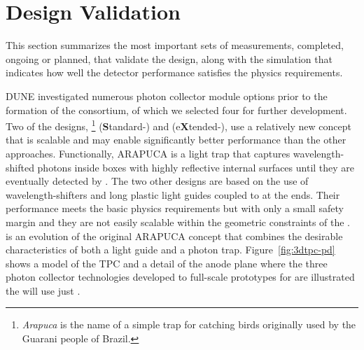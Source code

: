 \section{Design Validation}
\label{sec:fdsp-pd-validation}


This section summarizes the most important sets of measurements, completed, %
ongoing or planned, that validate the  design, along with the  simulation that indicates how well the  detector performance satisfies %
the physics requirements.


DUNE investigated numerous  photon collector module options prior to the formation of the \single {} consortium, of which we selected four for further development. 
Two of the designs, \footnote{\textit{Arapuca} is the name of a simple trap for catching birds originally used by the Guarani people of Brazil.} (\textbf{S}tandard-) and  (e\textbf{X}tended-), use a relatively new concept that is scalable and may enable %
significantly better performance than the other approaches. Functionally, ARAPUCA is %
 a light trap that captures wavelength-shifted photons inside boxes with highly reflective internal surfaces until they are eventually detected by .  The two other designs are based on the use of wavelength-shifters and long plastic light guides coupled to  at the ends. Their performance meets the basic physics requirements but with only a small safety margin and they are not easily scalable within the geometric constraints of the .  is an evolution of the original ARAPUCA concept that combines the desirable characteristics of both a light guide and a photon trap. 
Figure~\ref{fig:3dtpc-pd} shows a \threed model of the \single TPC %
and a detail of the anode plane where the three photon collector technologies developed to full-scale prototypes for  are illustrated %
the  will %
use just .

